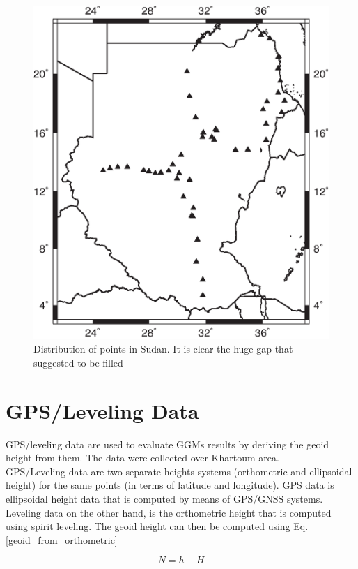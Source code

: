\begin{figure}[t]
	\caption{Distribution of \citep{osman} points in Sudan. It is clear the huge gap that \citet{osman} suggested to be filled}
	\label{sudan_data_distribution}
	\includegraphics{Figures/points_dist.eps}
	\centering
\end{figure}


\section{GPS/Leveling Data}

GPS/leveling data are used to evaluate GGMs results by deriving the geoid height from them. The data were collected over Khartoum area. \\
GPS/Leveling data are two separate heights systems (orthometric and ellipsoidal height) for the same points (in terms of latitude and longitude). GPS data is ellipsoidal height data that is computed by means of GPS/GNSS systems. Leveling data on the other hand, is the orthometric height that is computed using spirit leveling. The geoid height can then be computed using Eq. \eqref{geoid_from_orthometric}

\begin{equation}
\label{eqn:geoid_from_orthometric}
N = h - H
\end{equation}

